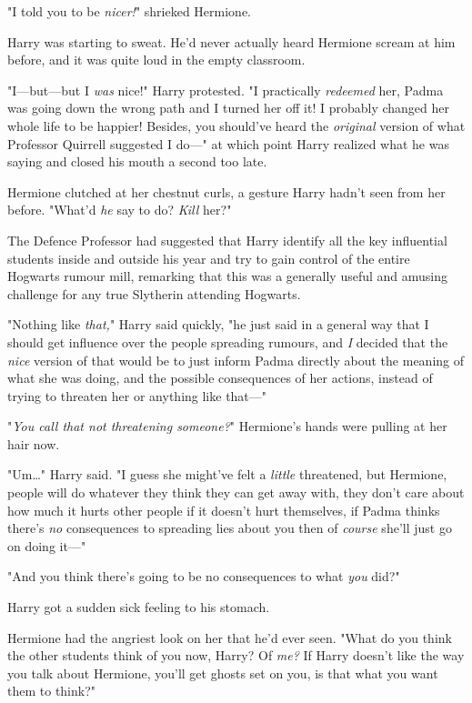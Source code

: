"I told you to be \emph{nicer!}" shrieked Hermione.

Harry was starting to sweat. He’d never actually heard Hermione scream at him
before, and it was quite loud in the empty classroom.

"I—but—but I \emph{was} nice!" Harry protested. "I practically
\emph{redeemed} her, Padma was going down the wrong path and I turned her off
it! I probably changed her whole life to be happier! Besides, you should’ve
heard the \emph{original} version of what Professor Quirrell suggested I do—"
at which point Harry realized what he was saying and closed his mouth a second
too late.

Hermione clutched at her chestnut curls, a gesture Harry hadn’t seen from her
before. "What’d \emph{he} say to do? \emph{Kill} her?"

The Defence Professor had suggested that Harry identify all the key influential
students inside and outside his year and try to gain control of the entire
Hogwarts rumour mill, remarking that this was a generally useful and amusing
challenge for any true Slytherin attending Hogwarts.

"Nothing like \emph{that,}" Harry said quickly, "he just said in a general way
that I should get influence over the people spreading rumours, and \emph{I}
decided that the \emph{nice} version of that would be to just inform Padma
directly about the meaning of what she was doing, and the possible consequences
of her actions, instead of trying to threaten her or anything like that—"

"\emph{You call that not threatening someone?}" Hermione’s hands were pulling
at her hair now.

"Um…" Harry said. "I guess she might’ve felt a \emph{little} threatened,
but Hermione, people will do whatever they think they can get away with, they
don’t care about how much it hurts other people if it doesn’t hurt themselves,
if Padma thinks there’s \emph{no} consequences to spreading lies about you then
of \emph{course} she’ll just go on doing it—"

"And you think there’s going to be no consequences to what \emph{you} did?"

Harry got a sudden sick feeling to his stomach.

Hermione had the angriest look on her that he’d ever seen. "What do you think
the other students think of you now, Harry? Of \emph{me?} If Harry doesn’t like
the way you talk about Hermione, you’ll get ghosts set on you, is that what you
want them to think?"

